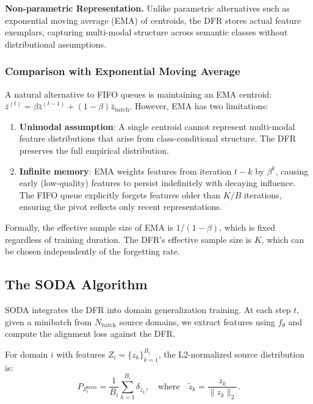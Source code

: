 \documentclass[preprint,12pt]{elsarticle}
\providecommand{\DIFaddend}{} %
\DeclareRobustCommand{\DIFaddend}{\DIFOaddend \let\includegraphics\DIFOincludegraphics} %
\begin{document}
\DIFaddend \textbf{Non-parametric Representation.} Unlike parametric alternatives such as exponential moving average (EMA) of centroids, the DFR stores actual feature exemplars, capturing multi-modal structure across semantic classes without distributional assumptions.

\subsubsection{Comparison with Exponential Moving Average}

A natural alternative to FIFO queues is maintaining an EMA centroid: $\bar{z}^{(t)} = \beta \bar{z}^{(t-1)} + (1-\beta) \bar{z}_{\text{batch}}$. However, EMA has two limitations:

\begin{enumerate}
    \item \textbf{Unimodal assumption}: A single centroid cannot represent multi-modal feature distributions that arise from class-conditional structure. The DFR preserves the full empirical distribution.

    \item \textbf{Infinite memory}: EMA weights features from iteration $t-k$ by $\beta^k$, causing early (low-quality) features to persist indefinitely with decaying influence. The FIFO queue explicitly forgets features older than $K/B$ iterations, ensuring the pivot reflects only recent representations.
\end{enumerate}

Formally, the effective sample size of EMA is $1/(1-\beta)$, which is fixed regardless of training duration. The DFR's effective sample size is $K$, which can be chosen independently of the forgetting rate.

\subsection{The SODA Algorithm}
\label{ssec:soda_algorithm}

SODA integrates the DFR into domain generalization training. At each step $t$, given a minibatch from $N_{\text{batch}}$ source domains, we extract features using $f_\theta$ and compute the alignment loss against the DFR.

For domain $i$ with features $Z_i = \{z_k\}_{k=1}^{B_i}$, the L2-normalized source distribution is:
\begin{equation}
    P_{Z_i^{\text{norm}}} = \frac{1}{B_i} \sum_{k=1}^{B_i} \delta_{\tilde{z}_k}, \quad \text{where} \quad \tilde{z}_k = \frac{z_k}{\|z_k\|_2}.
\end{equation}
\end{document}
